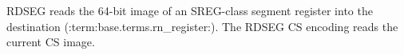 RDSEG reads the 64-bit image of an SREG-class segment register into the destination (:term:base.terms.rn_register:). The RDSEG CS encoding reads the current CS image.
